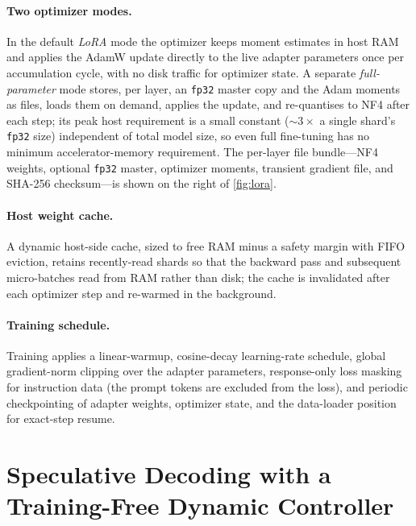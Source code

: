 \documentclass{article}
\begin{document}
\paragraph{Two optimizer modes.} In the default \emph{LoRA} mode the optimizer
keeps moment estimates in host RAM and applies the AdamW update directly to the
live adapter parameters once per accumulation cycle, with no disk traffic for
optimizer state. A separate \emph{full-parameter} mode stores, per layer, an
\texttt{fp32} master copy and the Adam moments as files, loads them on demand,
applies the update, and re-quantises to NF4 after each step; its peak host
requirement is a small constant ($\sim$$3\times$ a single shard's \texttt{fp32}
size) independent of total model size, so even full fine-tuning has no minimum
accelerator-memory requirement. The per-layer file bundle---NF4 weights, optional
\texttt{fp32} master, optimizer moments, transient gradient file, and SHA-256
checksum---is shown on the right of \autoref{fig:lora}.

\paragraph{Host weight cache.} A dynamic host-side cache, sized to free RAM minus
a safety margin with FIFO eviction, retains recently-read shards so that the
backward pass and subsequent micro-batches read from RAM rather than disk; the
cache is invalidated after each optimizer step and re-warmed in the background.

\paragraph{Training schedule.} Training applies a linear-warmup, cosine-decay
learning-rate schedule, global gradient-norm clipping over the adapter
parameters, response-only loss masking for instruction data (the prompt tokens
are excluded from the loss), and periodic checkpointing of adapter weights,
optimizer state, and the data-loader position for exact-step resume.

\section{Speculative Decoding with a Training-Free Dynamic Controller}
\label{sec:spec}
\end{document}
